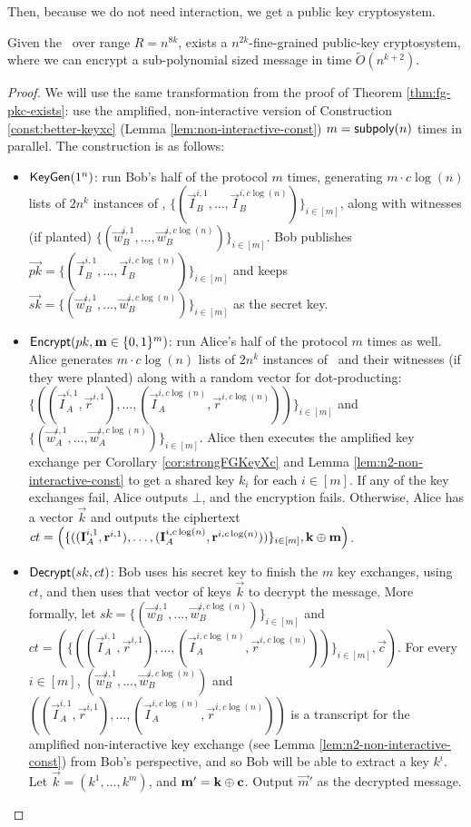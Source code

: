 Then, because we do not need interaction, we get a public key cryptosystem.
\begin{corollary}
	Given the \strongzkc~over range $R = n^{8k}$, exists a $n^{2k}$-fine-grained public-key cryptosystem, where we can encrypt a sub-polynomial sized message in time $\tilde{O}\left(n^{k + 2}\right)$.
	\label{cor:n2-pkc}
\end{corollary}
\begin{proof}
	We will use the same transformation from the proof of Theorem \ref{thm:fg-pkc-exists}: use the amplified, non-interactive version of Construction \ref{const:better-keyxc} (Lemma \ref{lem:non-interactive-const}) $m = \mathsf{subpoly}(n)$ times in parallel. The construction is as follows:
	\begin{itemize}
		\item $\textsf{KeyGen}(1^n)$: run Bob's half of the protocol $m$ times, generating $m \cdot c\log(n)$ lists of $2n^k$ instances of \zkclique, $\{(\vec I_B^{i,1}, \ldots, \vec I_B^{i,c\log(n)})\}_{i \in [m]}$, along with witnesses (if planted) $\{(\vec w_B^{i, 1}, \ldots, \vec w_B^{i, c\log(n)})\}_{i \in [m]}$. Bob publishes $\vec{pk} = \{(\vec I_B^{i,1}, \ldots, \vec I_B^{i,c\log(n)})\}_{i \in [m]}$ and keeps $\vec{sk} = \{(\vec w_B^{i, 1}, \ldots, \vec w_B^{i, c\log(n)})\}_{i \in [m]}$ as the secret key.
		
		\item $\textsf{Encrypt}(pk, \mathbf m \in \{0,1\}^m)$: run Alice's half of the protocol $m$ times as well. Alice generates $m \cdot c \log(n)$ lists of $2n^k$ instances of \zkclique~and their witnesses (if they were planted) along with a random vector for dot-producting: $\{((\vec I_A^{i,1}, \vec r^{i, 1}), \ldots, (\vec I_A^{i,c\log(n)}, \vec r^{i, c \log(n)}))\}_{i \in [m]}$ and $\{(\vec w_A^{i, 1}, \ldots, \vec w_A^{i, c\log(n)})\}_{i \in [m]}$. Alice then executes the amplified key exchange per Corollary \ref{cor:strongFGKeyXc} and Lemma \ref{lem:n2-non-interactive-const} to get a shared key $k_i$ for each $i \in [m]$. If any of the key exchanges fail, Alice outputs $\bot$, and the encryption fails. Otherwise, Alice has a vector $\vec k$ and outputs the ciphertext $ct = \left( \{((\mathbf I_A^{i,1}, \mathbf r^{i, 1}), \ldots, (\mathbf I_A^{i,c\log(n)}, \mathbf r^{i, c \log(n)}))\}_{i \in [m]}, \mathbf k \oplus \mathbf m \right)$.
		
		\item $\textsf{Decrypt}(sk, ct)$: Bob uses his secret key to finish the $m$ key exchanges, using $ct$, and then uses that vector of keys $\vec k$ to decrypt the message. More formally, let $sk = \{(\vec w_B^{i, 1}, \ldots, \vec w_B^{i, c\log(n)})\}_{i \in [m]}$ and $ct = \left( \{((\vec I_A^{i,1}, \vec r^{i, 1}), \ldots, (\vec I_A^{i,c\log(n)}, \vec r^{i, c \log(n)}))\}_{i \in [m]}, \vec c \right)$. For every $i \in [m]$, $(\vec w_B^{i, 1}, \ldots, \vec w_B^{i, c\log(n)})$ and $((\vec I_A^{i,1}, \vec r^{i, 1}), \ldots, (\vec I_A^{i,c\log(n)}, \vec r^{i, c \log(n)}))$ is a transcript for the amplified non-interactive key exchange (see Lemma \ref{lem:n2-non-interactive-const}) from Bob's perspective, and so Bob will be able to extract a key $k^i$. Let $\vec k =(k^1, \ldots, k^m)$, and $\mathbf m' = \mathbf k \oplus \mathbf c$. Output $\vec m'$ as the decrypted message.
	\end{itemize}
	

\end{proof}
